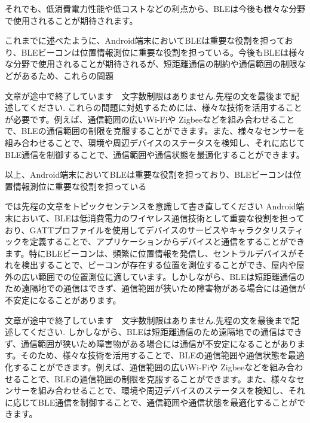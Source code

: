 それでも、低消費電力性能や低コストなどの利点から、BLEは今後も様々な分野で使用されることが期待されます。

これまでに述べたように、Android端末においてBLEは重要な役割を担っており、BLEビーコンは位置情報測位に重要な役割を担っている。今後もBLEは様々な分野で使用されることが期待されるが、短距離通信の制約や通信範囲の制限などがあるため、これらの問題





文章が途中で終了しています　文字数制限はありません.先程の文を最後まで記述してください.
これらの問題に対処するためには、様々な技術を活用することが必要です。例えば、通信範囲の広いWi-Fiや Zigbeeなどを組み合わせることで、BLEの通信範囲の制限を克服することができます。また、様々なセンサーを組み合わせることで、環境や周辺デバイスのステータスを検知し、それに応じてBLE通信を制御することで、通信範囲や通信状態を最適化することができます。

以上、Android端末においてBLEは重要な役割を担っており、BLEビーコンは位置情報測位に重要な役割を担っている





では先程の文章をトピックセンテンスを意識して書き直してください
Android端末において、BLEは低消費電力のワイヤレス通信技術として重要な役割を担っており、GATTプロファイルを使用してデバイスのサービスやキャラクタリスティックを定義することで、アプリケーションからデバイスと通信をすることができます。特にBLEビーコンは、頻繁に位置情報を発信し、セントラルデバイスがそれを検出することで、ビーコンが存在する位置を測位することができ、屋内や屋外の広い範囲での位置測位に適しています。しかしながら、BLEは短距離通信のため遠隔地での通信はできず、通信範囲が狭いため障害物がある場合には通信が不安定になることがあります。





文章が途中で終了しています　文字数制限はありません.先程の文を最後まで記述してください.
しかしながら、BLEは短距離通信のため遠隔地での通信はできず、通信範囲が狭いため障害物がある場合には通信が不安定になることがあります。そのため、様々な技術を活用することで、BLEの通信範囲や通信状態を最適化することができます。例えば、通信範囲の広いWi-Fiや Zigbeeなどを組み合わせることで、BLEの通信範囲の制限を克服することができます。また、様々なセンサーを組み合わせることで、環境や周辺デバイスのステータスを検知し、それに応じてBLE通信を制御することで、通信範囲や通信状態を最適化することができます。
